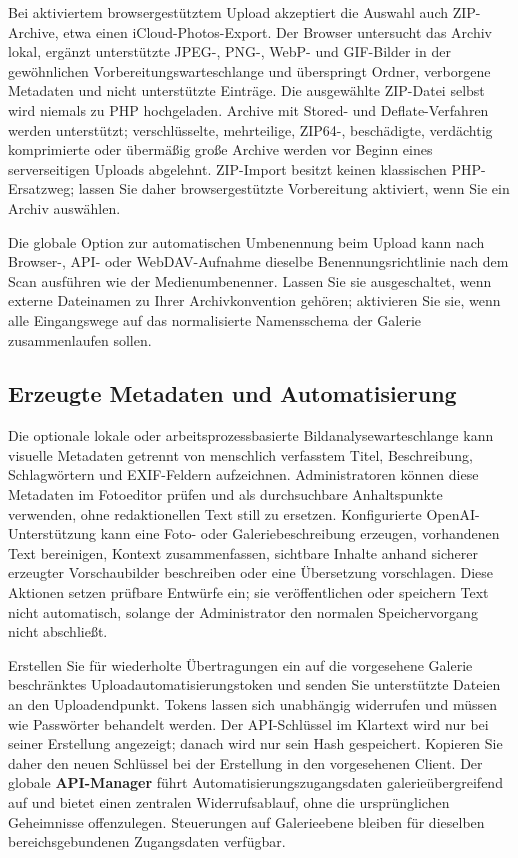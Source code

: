\documentclass[11pt,a4paper]{article}
\newcommand{\ui}[1]{\textbf{#1}}
\begin{document}
Bei aktiviertem browsergestütztem Upload akzeptiert die Auswahl auch
ZIP-Archive, etwa einen iCloud-Photos-Export. Der Browser untersucht das Archiv
lokal, ergänzt unterstützte JPEG-, PNG-, WebP- und GIF-Bilder in der
gewöhnlichen Vorbereitungswarteschlange und überspringt Ordner, verborgene
Metadaten und nicht unterstützte Einträge. Die ausgewählte ZIP-Datei selbst wird
niemals zu PHP hochgeladen. Archive mit Stored- und Deflate-Verfahren werden
unterstützt; verschlüsselte, mehrteilige, ZIP64-, beschädigte, verdächtig
komprimierte oder übermäßig große Archive werden vor Beginn eines serverseitigen
Uploads abgelehnt. ZIP-Import besitzt keinen klassischen PHP-Ersatzweg; lassen
Sie daher browsergestützte Vorbereitung aktiviert, wenn Sie ein Archiv
auswählen.

Die globale Option zur automatischen Umbenennung beim Upload kann nach Browser-,
API- oder WebDAV-Aufnahme dieselbe Benennungsrichtlinie nach dem Scan ausführen
wie der Medienumbenenner. Lassen Sie sie ausgeschaltet, wenn externe Dateinamen
zu Ihrer Archivkonvention gehören; aktivieren Sie sie, wenn alle Eingangswege
auf das normalisierte Namensschema der Galerie zusammenlaufen sollen.
\subsection{Erzeugte Metadaten und Automatisierung}

Die optionale lokale oder arbeitsprozessbasierte Bildanalysewarteschlange kann
visuelle Metadaten getrennt von menschlich verfasstem Titel, Beschreibung,
Schlagwörtern und EXIF-Feldern aufzeichnen. Administratoren können diese
Metadaten im Fotoeditor prüfen und als durchsuchbare Anhaltspunkte verwenden,
ohne redaktionellen Text still zu ersetzen. Konfigurierte OpenAI-Unterstützung
kann eine Foto- oder Galeriebeschreibung erzeugen, vorhandenen Text bereinigen,
Kontext zusammenfassen, sichtbare Inhalte anhand sicherer erzeugter
Vorschaubilder beschreiben oder eine Übersetzung vorschlagen. Diese Aktionen
setzen prüfbare Entwürfe ein; sie veröffentlichen oder speichern Text nicht
automatisch, solange der Administrator den normalen Speichervorgang nicht
abschließt.

Erstellen Sie für wiederholte Übertragungen ein auf die vorgesehene Galerie
beschränktes Uploadautomatisierungstoken und senden Sie unterstützte Dateien an
den Uploadendpunkt. Tokens lassen sich unabhängig widerrufen und müssen wie
Passwörter behandelt werden. Der API-Schlüssel im Klartext wird nur bei seiner
Erstellung angezeigt; danach wird nur sein Hash gespeichert. Kopieren Sie daher
den neuen Schlüssel bei der Erstellung in den vorgesehenen Client. Der globale
\ui{API-Manager} führt Automatisierungszugangsdaten galerieübergreifend auf und
bietet einen zentralen Widerrufsablauf, ohne die ursprünglichen Geheimnisse
offenzulegen. Steuerungen auf Galerieebene bleiben für dieselben
bereichsgebundenen Zugangsdaten verfügbar.
\end{document}

